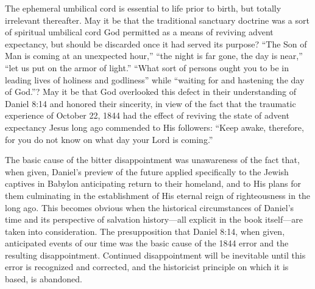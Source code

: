 The ephemeral umbilical cord is essential to life prior to birth, but
totally irrelevant thereafter. May it be that the traditional sanctuary
doctrine was a sort of spiritual umbilical cord God permitted as a means of
reviving advent expectancy, but should be discarded once it had served its
purpose? ``The Son of Man is coming at an unexpected hour,'' ``the night is far
gone, the day is near,'' ``let us put on the armor of light.'' ``What sort of
persons ought you to be in leading lives of holiness and godliness'' while
``waiting for and hastening the day of God.''? May it be that God
overlooked this defect in their understanding of Daniel 8:14 and honored
their sincerity, in view of the fact that the traumatic experience of
October 22, 1844 had the effect of reviving the state of advent expectancy
Jesus long ago commended to His followers: ``Keep awake, therefore, for you
do not know on what day your Lord is coming.''

The basic cause of the bitter disappointment was unawareness of the fact
that, when given, Daniel's preview of the future applied specifically to the
Jewish captives in Babylon anticipating return to their homeland, and to His
plans for them culminating in the establishment of His eternal reign of
righteousness in the long ago. This becomes obvious when the historical
circumstances of Daniel's time and its perspective of salvation
history---all explicit in the book itself---are taken into consideration.
The presupposition that Daniel 8:14, when given, anticipated events of our
time was the basic cause of the 1844 error and the resulting disappointment.
Continued disappointment will be inevitable until this error is recognized
and corrected, and the historicist principle on which it is based, is
abandoned.
